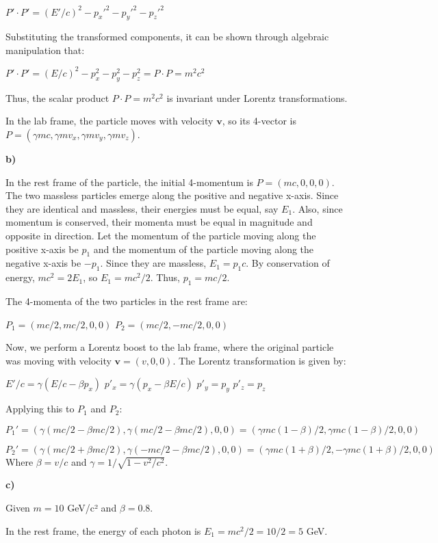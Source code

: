 \documentclass{article}
\begin{document}
$P' \cdot P' = (E'/c)^2 - p_x'^2 - p_y'^2 - p_z'^2$

Substituting the transformed components, it can be shown through algebraic manipulation that:

$P' \cdot P' = (E/c)^2 - p_x^2 - p_y^2 - p_z^2 = P \cdot P = m^2 c^2$

Thus, the scalar product $P \cdot P = m^2 c^2$ is invariant under Lorentz transformations.

In the lab frame, the particle moves with velocity $\textbf{v}$, so its 4-vector is $P = (\gamma mc, \gamma m v_x, \gamma m v_y, \gamma m v_z)$.

\textbf{b)}

In the rest frame of the particle, the initial 4-momentum is $P = (mc, 0, 0, 0)$. The two massless particles emerge along the positive and negative x-axis. Since they are identical and massless, their energies must be equal, say $E_1$. Also, since momentum is conserved, their momenta must be equal in magnitude and opposite in direction. Let the momentum of the particle moving along the positive x-axis be $p_1$ and the momentum of the particle moving along the negative x-axis be $-p_1$. Since they are massless, $E_1 = p_1 c$.
By conservation of energy, $mc^2 = 2E_1$, so $E_1 = mc^2/2$. Thus, $p_1 = mc/2$.

The 4-momenta of the two particles in the rest frame are:

$P_1 = (mc/2, mc/2, 0, 0)$
$P_2 = (mc/2, -mc/2, 0, 0)$

Now, we perform a Lorentz boost to the lab frame, where the original particle was moving with velocity $\textbf{v} = (v, 0, 0)$. The Lorentz transformation is given by:

$E'/c = \gamma (E/c - \beta p_x)$
$p'_x = \gamma (p_x - \beta E/c)$
$p'_y = p_y$
$p'_z = p_z$

Applying this to $P_1$ and $P_2$:

$P_1' = (\gamma (mc/2 - \beta mc/2), \gamma(mc/2 - \beta mc/2), 0, 0) = (\gamma mc(1-\beta)/2, \gamma mc(1-\beta)/2, 0, 0)$

$P_2' = (\gamma (mc/2 + \beta mc/2), \gamma(-mc/2 - \beta mc/2), 0, 0) = (\gamma mc(1+\beta)/2, -\gamma mc(1+\beta)/2, 0, 0)$
Where $\beta = v/c$ and $\gamma = 1/\sqrt{1-v^2/c^2}$.

\textbf{c)}

Given $m = 10$ GeV/c² and $\beta = 0.8$.

In the rest frame, the energy of each photon is $E_1 = mc^2/2 = 10/2 = 5$ GeV.
\end{document}
